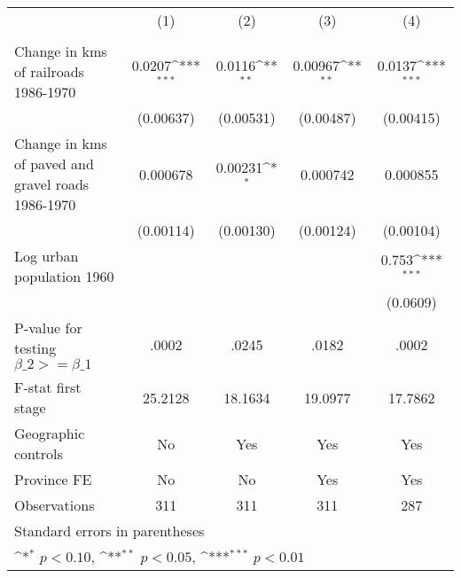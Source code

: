 {
\def\sym#1{\ifmmode^{#1}\else\(^{#1}\)\fi}
\begin{tabular}{l*{4}{c}}
\hline\hline
                &\multicolumn{1}{c}{(1)}&\multicolumn{1}{c}{(2)}&\multicolumn{1}{c}{(3)}&\multicolumn{1}{c}{(4)}\\
                &\multicolumn{1}{c}{}&\multicolumn{1}{c}{}&\multicolumn{1}{c}{}&\multicolumn{1}{c}{}\\
\hline
Change in kms of railroads 1986-1970&   0.0207\sym{***}&   0.0116\sym{**} &  0.00967\sym{**} &   0.0137\sym{***}\\
                &(0.00637)         &(0.00531)         &(0.00487)         &(0.00415)         \\
[1em]
Change in kms of paved and gravel roads 1986-1970& 0.000678         &  0.00231\sym{*}  & 0.000742         & 0.000855         \\
                &(0.00114)         &(0.00130)         &(0.00124)         &(0.00104)         \\
[1em]
Log urban population 1960&                  &                  &                  &    0.753\sym{***}\\
                &                  &                  &                  & (0.0609)         \\
\hline
P-value for testing $\beta\_{2} >= \beta\_{1}$&    .0002         &    .0245         &    .0182         &    .0002         \\
F-stat first stage&  25.2128         &  18.1634         &  19.0977         &  17.7862         \\
Geographic controls&       No         &      Yes         &      Yes         &      Yes         \\
Province FE     &       No         &       No         &      Yes         &      Yes         \\
Observations    &      311         &      311         &      311         &      287         \\
\hline\hline
\multicolumn{5}{l}{\footnotesize Standard errors in parentheses}\\
\multicolumn{5}{l}{\footnotesize \sym{*} \(p<0.10\), \sym{**} \(p<0.05\), \sym{***} \(p<0.01\)}\\
\end{tabular}
}
